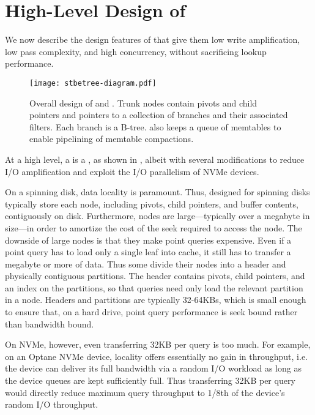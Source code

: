 \section{High-Level Design of \datastructs}\label{sec:design}

We now describe the design features of \datastructs that give them 
low write amplification, low pass complexity, and high
concurrency, without sacrificing lookup performance.

\begin{figure}[t]
  \begin{center}
    \texttt{[image: stbetree-diagram.pdf]}
    \caption{Overall design of \datastructs and \sysname.  Trunk
      nodes contain pivots and child pointers and pointers to a
      collection of branches and their associated filters.  Each branch
      is a B-tree.  \sysname also keeps a queue of memtables to
      enable pipelining of memtable
      compactions.}
    \label{fig:stbetree}
  \end{center}
\end{figure}

At a high level, a \datastruct is a \bet, as shown in
, albeit with several modifications to reduce I/O
amplification and exploit the I/O parallelism of NVMe devices.

On a spinning disk, data locality is paramount.  Thus, \bets designed
for spinning disks typically store each node, including pivots, child
pointers, and buffer contents, contiguously on disk.  Furthermore,
nodes are large---typically over a megabyte in size---in order to
amortize the cost of the seek required to access the node.  The
downside of large nodes is that they make point queries expensive.
Even if a point query has to load only a single leaf into cache, it
still has to transfer a megabyte or more of data.  Thus some \bets
divide their nodes into a header and physically contiguous
partitions.  The header contains pivots, child pointers, and an
index on the partitions, so that queries need only load the relevant
partition in a node.  Headers and partitions are typically 32-64KBs,
which is small enough to ensure that, on a hard drive, point query performance is seek
bound rather than bandwidth bound.

On NVMe, however, even transferring 32KB per query is too much.  For
example, on an Optane NVMe device, locality offers essentially no gain
in throughput, i.e. the device can deliver its full bandwidth via a
random I/O workload as long as the device queues are kept sufficiently
full.  Thus transferring 32KB per query would directly reduce maximum
query throughput to 1/8th of the device's random I/O throughput.

